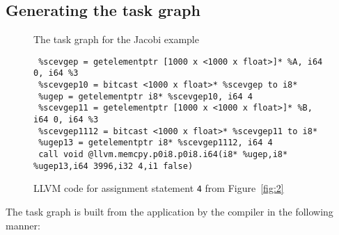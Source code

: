 \subsection{Generating the task graph}
\label{sec:build-appl-graph}

\begin{figure*}[t!]
  \centering
  \scalebox{0.37}{}
  \caption{The task graph for the Jacobi example}
  \label{fig:1}
\end{figure*}

\begin{figure*}[t!]
  \centering
\begin{verbatim}
 %scevgep = getelementptr [1000 x <1000 x float>]* %A, i64 0, i64 %3
 %scevgep10 = bitcast <1000 x float>* %scevgep to i8*
 %ugep = getelementptr i8* %scevgep10, i64 4
 %scevgep11 = getelementptr [1000 x <1000 x float>]* %B, i64 0, i64 %3
 %scevgep1112 = bitcast <1000 x float>* %scevgep11 to i8*
 %ugep13 = getelementptr i8* %scevgep1112, i64 4
 call void @llvm.memcpy.p0i8.p0i8.i64(i8* %ugep,i8* %ugep13,i64 3996,i32 4,i1 false)
\end{verbatim}
  \caption{LLVM code for assignment statement \texttt{4} from
    Figure~\ref{fig:2}}
  \label{fig:3}
\end{figure*}

The task graph is built from the application by the compiler %
in the
following manner:


